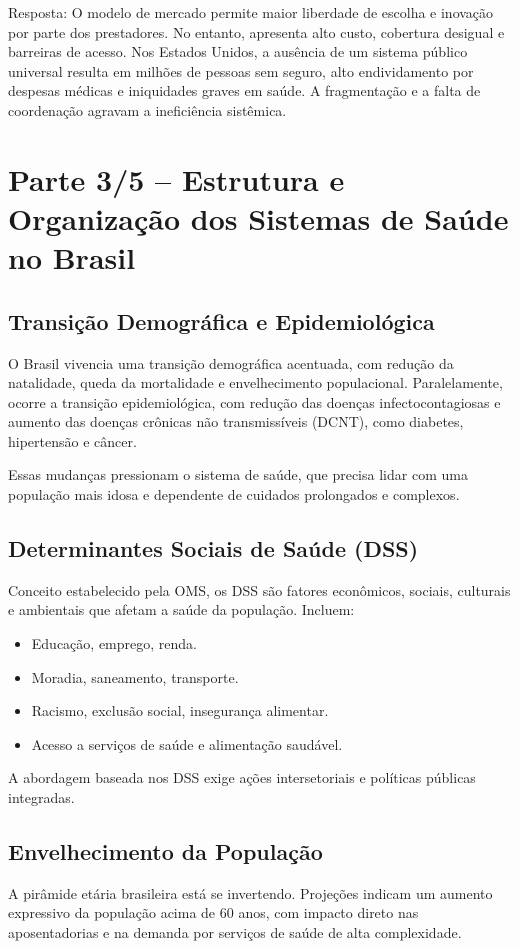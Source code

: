 \documentclass[a4paper,12pt]{article}
\begin{document}
Resposta:
O modelo de mercado permite maior liberdade de escolha e inovação por parte dos prestadores. No entanto, apresenta alto custo, cobertura desigual e barreiras de acesso. Nos Estados Unidos, a ausência de um sistema público universal resulta em milhões de pessoas sem seguro, alto endividamento por despesas médicas e iniquidades graves em saúde. A fragmentação e a falta de coordenação agravam a ineficiência sistêmica.
\section{Parte 3/5 – Estrutura e Organização dos Sistemas de Saúde no Brasil}
\label{sec:orgf48740d}

\subsection{Transição Demográfica e Epidemiológica}
\label{sec:orgbdbc459}
O Brasil vivencia uma transição demográfica acentuada, com redução da natalidade, queda da mortalidade e envelhecimento populacional. Paralelamente, ocorre a transição epidemiológica, com redução das doenças infectocontagiosas e aumento das doenças crônicas não transmissíveis (DCNT), como diabetes, hipertensão e câncer.

Essas mudanças pressionam o sistema de saúde, que precisa lidar com uma população mais idosa e dependente de cuidados prolongados e complexos.
\subsection{Determinantes Sociais de Saúde (DSS)}
\label{sec:org1954b62}
Conceito estabelecido pela OMS, os DSS são fatores econômicos, sociais, culturais e ambientais que afetam a saúde da população. Incluem:
\begin{itemize}
\item Educação, emprego, renda.
\item Moradia, saneamento, transporte.
\item Racismo, exclusão social, insegurança alimentar.
\item Acesso a serviços de saúde e alimentação saudável.
\end{itemize}

A abordagem baseada nos DSS exige ações intersetoriais e políticas públicas integradas.
\subsection{Envelhecimento da População}
\label{sec:orge32ab2e}
A pirâmide etária brasileira está se invertendo. Projeções indicam um aumento expressivo da população acima de 60 anos, com impacto direto nas aposentadorias e na demanda por serviços de saúde de alta complexidade.
\end{document}
